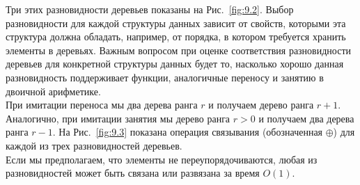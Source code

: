 
\begin{frame}[fragile]{}
Три этих разновидности деревьев показаны на
Рис.~\ref{fig:9.2}. Выбор разновидности для каждой структуры данных
зависит от свойств, которыми эта структура должна обладать, например,
от порядка, в котором требуется хранить элементы в деревьях. Важным
вопросом при оценке соответствия разновидности деревьев для конкретной
структуры данных будет то, насколько хорошо данная разновидность
поддерживает функции, аналогичные переносу и занятию в двоичной
арифметике.\\

 При имитации переноса мы  два дерева
ранга $r$ и получаем дерево ранга $r+1$. Аналогично, при имитации
занятия мы  дерево ранга $r > 0$ и получаем
два дерева ранга $r-1$. На Рис.~\ref{fig:9.3} показана операция
связывания (обозначенная $\oplus$)
для каждой из трех разновидностей деревьев.\\

Если мы предполагаем, что
элементы не переупорядочиваются, любая из разновидностей может быть
связана или развязана за время $O(1)$.

\end{frame}

